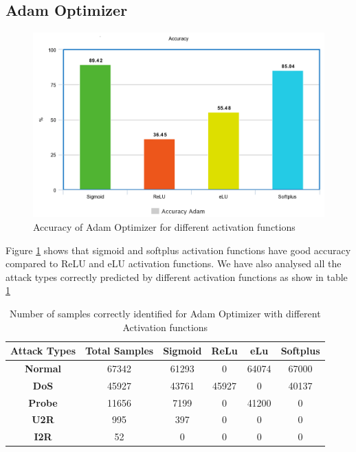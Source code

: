 \documentclass[12pt, a4paper]{report}
\begin{document}
\subsection {Adam Optimizer}
\begin{figure}[ht]
\centering
\captionsetup{justification=centering,margin=2cm}
\includegraphics[width=13cm]{adam_accuracy_greedy.png}
\caption{ Accuracy of Adam Optimizer for different activation functions}
\label{fig:accuracy_adam_greedy}
\end{figure}

Figure \ref{fig:accuracy_adam_greedy} shows that sigmoid and softplus activation functions have good accuracy compared to ReLU and eLU activation functions.
We have also analysed all the attack types correctly predicted by different activation functions as show in table \ref{confusion_adam}
\clearpage
\begin{table}[ht]
\centering
\captionsetup{justification=centering,margin=2cm}
\begin{tabular}{|c|c|c|c|c|c|}
\hline
\textbf{Attack Types} & \textbf{Total Samples} & \textbf{Sigmoid} & \textbf{ReLu} & \textbf{eLu} & \textbf{Softplus} \\ \hline
\textbf{Normal}       & 67342                  & 61293            & 0         & 64074        & 67000             \\ \hline
\textbf{DoS}          & 45927                  & 43761          		  & 45927         & 0         & 40137             \\ \hline
\textbf{Probe}        & 11656                  & 7199           		  & 0          & 41200         & 0              \\ \hline
\textbf{U2R}          & 995                    & 397              		& 0           & 0          & 0               \\ \hline
\textbf{I2R}          & 52                     & 0               		& 0            & 0           & 0                \\ \hline
\end{tabular}
\caption{Number of samples correctly identified for Adam Optimizer with different Activation functions}
\label{confusion_adam}
\end{table}
 
\end{document}
